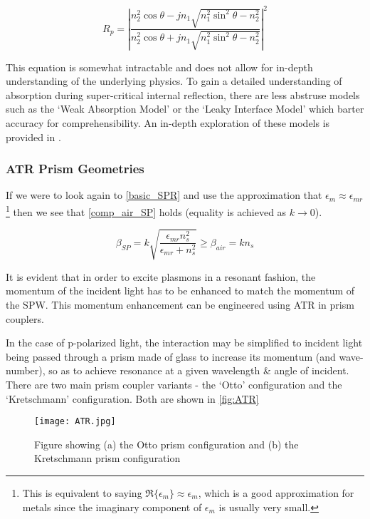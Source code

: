 \begin{equation}
R_p = \left| \frac{n_2^2 \cos \theta - j n_1 \sqrt{n_1^2 \sin ^2 \theta - n_2^2}}{n_2^2 \cos \theta + j n_1 \sqrt{n_1^2 \sin ^2 \theta - n_2^2}}\right|^2
\end{equation}\label{super_crit_ref}

This equation is somewhat intractable and does not allow for in-depth understanding of the underlying physics. To gain a detailed understanding of absorption during super-critical internal reflection, there are less abstruse models such as the `Weak Absorption Model' or the `Leaky Interface Model' which barter accuracy for comprehensibility. An in-depth exploration of these models is provided in \cite{ATR_book}. 

\subsubsection{ATR Prism Geometries}

If we were to look again to \autoref{basic_SPR} and use the approximation that $\epsilon_m \approx \epsilon_{mr}$ \footnote{This is equivalent to saying $\Re\{\epsilon_m\} \approx \epsilon_m$, which is a good approximation for metals since the imaginary component of $\epsilon_m$ is usually very small.} then we see that \autoref{comp_air_SP} holds (equality is achieved as $k \rightarrow 0$).

\begin{equation}\label{comp_air_SP}
\beta_{SP} = k \sqrt{\frac{\epsilon_{mr} n_s^2}{\epsilon_{mr}+ n_s^2}} \geq \beta_{air} = k n_s
\end{equation}

It is evident that in order to excite plasmons in a resonant fashion, the momentum of the incident light has to be enhanced to match the momentum of the SPW. This momentum enhancement can be engineered using ATR in prism couplers. 

In the case of p-polarized light, the interaction may be simplified to incident light being passed through a prism made of glass to increase its momentum (and wave-number), so as to achieve resonance at a given wavelength \& angle of incident. There are two main prism coupler variants - the `Otto' configuration and the `Kretschmann' configuration. Both are shown in \autoref{fig:ATR}

\begin{figure}
\centering
\texttt{[image: ATR.jpg]}
\caption{Figure showing (a) the Otto prism configuration and (b) the Kretschmann prism configuration}
\label{fig:ATR}
\end{figure}

